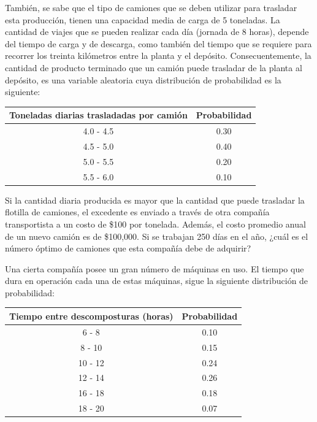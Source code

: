 \documentclass[11pt,letterpaper]{report}
\begin{document}
\begin{description}[leftmargin=1.2cm,style=nextline]
También, se sabe que el tipo de camiones que se deben utilizar para
trasladar esta producción, tienen una capacidad media de carga de 5
toneladas. La cantidad de viajes que se pueden realizar cada día (jornada de
8 horas), depende del tiempo de carga y de descarga, como también del tiempo
que se requiere para recorrer los treinta kilómetros entre la planta y el
depósito. Consecuentemente, la cantidad de producto terminado que un camión
puede trasladar de la planta al depósito, es una variable aleatoria cuya
distribución de probabilidad es la siguiente:

\begin{center}
\begin{tabular}{cc}
Toneladas diarias trasladadas por camión & Probabilidad \\
\midrule
4.0 - 4.5 & 0.30 \\
4.5 - 5.0 & 0.40 \\
5.0 - 5.5 & 0.20 \\
5.5 - 6.0 & 0.10 \\
\end{tabular}
\end{center}

Si la cantidad diaria producida es mayor que la cantidad que puede trasladar
la flotilla de camiones, el excedente es enviado a través de otra compañía
transportista a un costo de \$100 por tonelada. Además, el costo promedio
anual de un nuevo camión es de \$100,000. Si se trabajan 250 días en el año,
¿cuál es el número óptimo de camiones que esta compañía debe de adquirir?

\item[5.16.] Una cierta compañía posee un gran número de máquinas en uso. El
tiempo que dura en operación cada una de estas máquinas, sigue la siguiente
distribución de probabilidad:

\begin{center}
\begin{tabular}{cc}
Tiempo entre descomposturas (horas) & Probabilidad \\
\midrule
6 - 8   & 0.10 \\
8 - 10  & 0.15 \\
10 - 12 & 0.24 \\
12 - 14 & 0.26 \\
16 - 18 & 0.18 \\
18 - 20 & 0.07 \\
\end{tabular}
\end{center}


\end{description}
\end{document}
